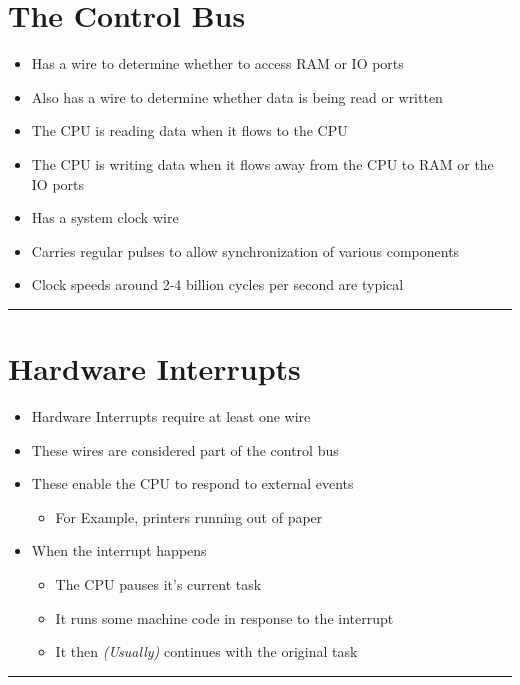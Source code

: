 \documentclass{article}
\begin{document}
  \section{The Control Bus}
  \begin{itemize}
    \item{Has a wire to determine whether to access RAM or IO ports}
    \item{Also has a wire to determine whether data is being read or written}
    \item{The CPU is reading data when it flows to the CPU}
    \item{The CPU is writing data when it flows away from the CPU to RAM or the IO ports}
    \item{Has a system clock wire}
    \item{Carries regular pulses to allow synchronization of various components}
    \item{Clock speeds around 2-4 billion cycles per second are typical}
  \end{itemize}

  \begin{center}
    \rule{0.5\textwidth}{0.4pt}
  \end{center}
  \section{Hardware Interrupts}
  \begin{itemize}
    \item{Hardware Interrupts require at least one wire}
    \item{These wires are considered part of the control bus}
    \item{These enable the CPU to respond to external events}
    \begin{itemize}
      \item{For Example, printers running out of paper}
    \end{itemize}
    \item{When the interrupt happens}
    \begin{itemize}
      \item{The CPU pauses it's current task}
      \item{It runs some machine code in response to the interrupt}
      \item{It then \textit{(Usually)} continues with the original task}
    \end{itemize}
  \end{itemize}
  \begin{center}
    \rule{0.5\textwidth}{0.4pt}
  \end{center}
\end{document}
